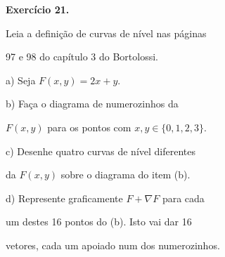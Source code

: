 \documentclass[oneside,12pt]{article}
\begin{document}
\newpage

{\bf Exercício 21.}


Leia a definição de curvas de nível nas páginas

97 e 98 do capítulo 3 do Bortolossi.

\msk

a) Seja $F(x,y) = 2x + y$.

\ssk

b) Faça o diagrama de numerozinhos da

$F(x,y)$ para os pontos com $x,y∈\{0,1,2,3\}$.

\ssk

c) Desenhe quatro curvas de nível diferentes

da $F(x,y)$ sobre o diagrama do item (b).

\ssk

d) Represente graficamente $F+∇F$ para cada

um destes 16 pontos do (b). Isto vai dar 16

vetores, cada um apoiado num dos numerozinhos.


\newpage


\end{document}
